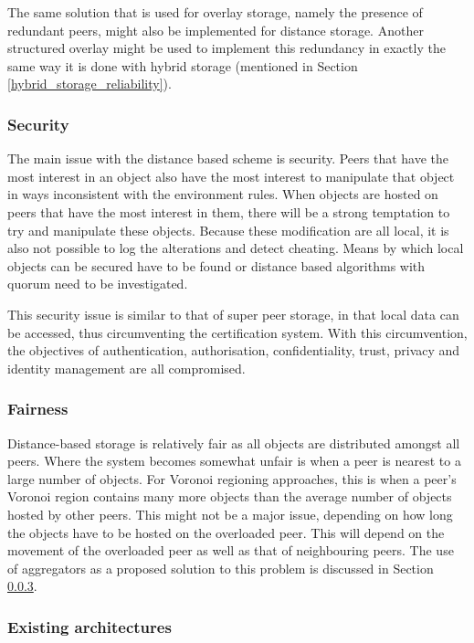 The same solution that is used for overlay storage, namely the presence of redundant peers, might also be implemented for distance storage. Another structured overlay might be used to implement this redundancy in exactly the same way it is done with hybrid storage (mentioned in Section \ref{hybrid_storage_reliability}).

\subsubsection{Security}
\label{distance_based_storage_security}

The main issue with the distance based scheme is security. Peers that have the most interest in an object also have the most interest to manipulate that object in ways inconsistent with the environment rules. When objects are hosted on peers that have the most interest in them, there will be a strong temptation to try and manipulate these objects. Because these modification are all local, it is also not possible to log the alterations and detect cheating. Means by which local objects can be secured have to be found or distance based algorithms with quorum need to be investigated.

This security issue is similar to that of super peer storage, in that local data can be accessed, thus circumventing the certification system. With this circumvention, the objectives of authentication, authorisation, confidentiality, trust, privacy and identity management are all compromised.

\subsubsection{Fairness}

Distance-based storage is relatively fair as all objects are distributed amongst all peers. Where the system becomes somewhat unfair is when a peer is nearest to a large number of objects. For Voronoi regioning approaches, this is when a peer's Voronoi region contains many more objects than the average number of objects hosted by other peers. This might not be a major issue, depending on how long the objects have to be hosted on the overloaded peer. This will depend on the movement of the overloaded peer as well as that of neighbouring peers. The use of aggregators as a proposed solution to this problem is discussed in Section \ref{distance_based_existing_archs}.

\subsubsection{Existing architectures}
\label{distance_based_existing_archs}

